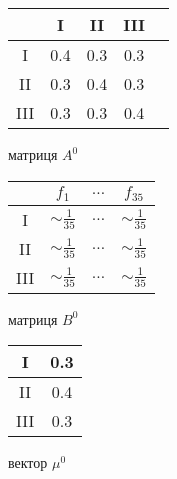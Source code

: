 \vspace{0.4cm}
\begin{table}[H]
    \begin{minipage}[H]{0.35\linewidth}
        \begin{center}
            \begin{tabular}{c|cccc}
                & I & II & III \\
                \hline
                I & 0.4 & 0.3 & 0.3 \\
                II & 0.3 & 0.4 & 0.3 \\
                III & 0.3 & 0.3 & 0.4 \\
            \end{tabular}
        \end{center} \centering матриця $A^0$
    \end{minipage}
    \hfill
    \begin{minipage}[H]{0.4\linewidth}
        \begin{center}
            \begin{tabular}{c|ccc}
                & $f_1$ & $\ldots$ & $f_{35}$ \\
                \hline
                I & $\sim \frac{1}{35}$ & $\ldots$ & $\sim \frac{1}{35}$ \\
                II & $\sim \frac{1}{35}$ & $\ldots$ & $\sim \frac{1}{35}$ \\
                III & $\sim \frac{1}{35}$ & $\ldots$ & $\sim \frac{1}{35}$ \\
            \end{tabular}
        \end{center} \centering матриця $B^0$
    \end{minipage}
    \hfill
    \begin{minipage}[H]{0.2\linewidth}
        \begin{center}
            \begin{tabular}{c|c}
                I & 0.3 \\
                \hline
                II & 0.4 \\
                \hline
                III & 0.3 \\
            \end{tabular}
        \end{center} \centering вектор $\mu^0$
    \end{minipage}
\end{table}


